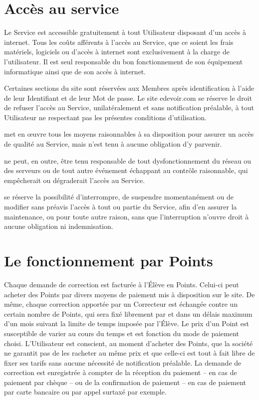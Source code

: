 \section{Accès au service}

Le Service est accessible gratuitement à tout Utilisateur disposant d'un accès à internet. Tous les coûts afférents à l'accès au Service, que ce soient les frais matériels, logiciels ou d'accès à internet sont exclusivement à la charge de l'utilisateur. Il est seul responsable du bon fonctionnement de son équipement informatique ainsi que de son accès à internet.

Certaines sections du site sont réservées aux Membres après identification à l'aide de leur Identifiant et de leur Mot de passe.
Le site edevoir.com se réserve le droit de refuser l'accès au Service, unilatéralement et sans notification préalable, à tout Utilisateur ne respectant pas les présentes conditions d'utilisation.

\eDevoir met en œuvre tous les moyens raisonnables à sa disposition pour assurer un accès de qualité au Service, mais n'est tenu à aucune obligation d'y parvenir.

\eDevoir ne peut, en outre, être tenu responsable de tout dysfonctionnement du réseau ou des serveurs ou de tout autre événement échappant au contrôle raisonnable, qui empêcherait ou dégraderait l'accès au Service.

\eDevoir se réserve la possibilité d'interrompre, de suspendre momentanément ou de modifier sans préavis l'accès à tout ou partie du Service, afin d'en assurer la maintenance, ou pour toute autre raison, sans que l'interruption n'ouvre droit à aucune obligation ni indemnisation.


\section{Le fonctionnement par Points}

Chaque demande de correction est facturée à l’\'Elève en Points. Celui-ci peut acheter des Points par divers moyens de paiement mis à disposition sur le site. De même, chaque correction apportée par un Correcteur est échangée contre un certain nombre de Points, qui sera fixé librement par \eDevoir et dans un délais maximum d'un mois suivant la limite de temps imposée par l'\'Elève. Le prix d'un Point est susceptible de varier au cours du temps et est fonction du mode de paiement choisi. L'Utilisateur est conscient, au moment d'acheter des Points, que la société \eDevoir ne garantit pas de les racheter au même prix et que celle-ci est tout à fait libre de fixer ses tarifs sans aucune nécessité de notification préalable.
La demande de correction est enregistrée à compter de la réception du paiement -- en cas de paiement par chèque -- ou de la confirmation de paiement -- en cas de paiement par carte bancaire ou par appel surtaxé par exemple.

